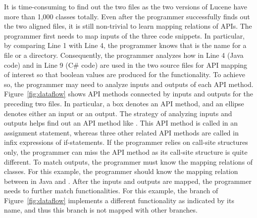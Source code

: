 It is time-consuming to find out the two files as the two versions
of Lucene have more than 1,000 classes totally. Even after the
programmer successfully finds out the two aligned files, it is still
non-trivial to learn mapping relations of APIs. The programmer first
needs to map inputs of the three code snippets. In particular, by
comparing Line 1 with Line 4, the programmer knows that
 is the name for a file or a directory. Consequently,
the programmer analyzes how  in Line 4 (Java code) and
 in Line 9 (C\# code) are used in the two source files
for API mapping of interest so that boolean values are produced for
the functionality. To achieve so, the programmer may need to analyze
inputs and outputs of each API method. Figure~\ref{fig:dataflow}
shows API methods connected by inputs and outputs for the preceding
two files. In particular, a box denotes an API method, and an
ellipse denotes either an input or an output. The strategy of
analyzing inputs and outputs helps find out an API method like
. This API method is called in
an assignment statement, whereas three other related API methods are
called in infix expressions of if-statements. If the programmer
relies on call-site structures only, the programmer can miss the API
method as its call-site structure is quite different. To match
outputs, the programmer must know the mapping relations of classes.
For this example, the programmer should know the mapping relation
between  in Java and . After
the inputs and outputs are mapped, the programmer needs to further
match functionalities. For this example, the 
branch of Figure~\ref{fig:dataflow} implements a different
functionality as indicated by its name, and thus this branch is not
mapped with other branches.

